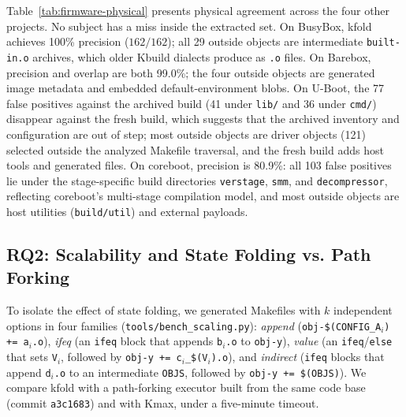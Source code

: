 \documentclass[acmsmall]{acmart}
\newcommand{\tool}{\textsf{kfold}\xspace}
\newcommand{\kmax}{\textsf{Kmax}\xspace}
\begin{document}
Table~\ref{tab:firmware-physical} presents physical agreement across the four other projects.
No subject has a miss inside the extracted set.
On BusyBox, \tool achieves 100\% precision ($162/162$); all 29 outside objects are intermediate \texttt{built-in.o} archives, which older Kbuild dialects produce as \texttt{.o} files.
On Barebox, precision and overlap are both 99.0\%; the four outside objects are generated image metadata and embedded default-environment blobs.
On U-Boot, the 77 false positives against the archived build (41 under \texttt{lib/} and 36 under \texttt{cmd/}) disappear against the fresh build, which suggests that the archived inventory and configuration are out of step; most outside objects are driver objects (121) selected outside the analyzed Makefile traversal, and the fresh build adds host tools and generated files.
On coreboot, precision is 80.9\%: all 103 false positives lie under the stage-specific build directories \texttt{verstage}, \texttt{smm}, and \texttt{decompressor}, reflecting coreboot's multi-stage compilation model, and most outside objects are host utilities (\texttt{build/util}) and external payloads.

\subsection{RQ2: Scalability and State Folding vs. Path Forking}\label{sec:eval:scaling}

To isolate the effect of state folding, we generated Makefiles with $k$ independent options in four families (\texttt{tools/bench\_scaling.py}):
\emph{append} (\texttt{obj-\$(CONFIG\_A$_i$) += a$_i$.o}),
\emph{ifeq} (an \texttt{ifeq} block that appends \texttt{b$_i$.o} to \texttt{obj-y}),
\emph{value} (an \texttt{ifeq}/\texttt{else} that sets \texttt{V$_i$}, followed by \texttt{obj-y += c$_i$\_\$(V$_i$).o}), and
\emph{indirect} (\texttt{ifeq} blocks that append \texttt{d$_i$.o} to an intermediate \texttt{OBJS}, followed by \texttt{obj-y += \$(OBJS)}).
We compare \tool with a path-forking executor built from the same code base (commit \texttt{a3c1683}) and with \kmax, under a five-minute timeout.
\end{document}
